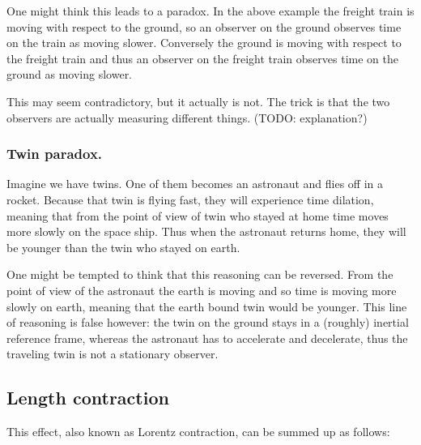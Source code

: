 One might think this leads to a paradox. In the above example the freight train is moving with respect to the ground, so an observer on the ground observes time on the train as moving slower. Conversely the ground is moving with respect to the freight train and thus an observer on the freight train observes time on the ground as moving slower.

This may seem contradictory, but it actually is not. The trick is that the two observers are actually measuring different things. (TODO: explanation?)

\subsubsection{Twin paradox.} Imagine we have twins. One of them becomes an astronaut and flies off in a rocket. Because that twin is flying fast, they will experience time dilation, meaning that from the point of view of twin who stayed at home time moves more slowly on the space ship. Thus when the astronaut returns home, they will be younger than the twin who stayed on earth.

One might be tempted to think that this reasoning can be reversed. From the point of view of the astronaut the earth is moving and so time is moving more slowly on earth, meaning that the earth bound twin would be younger. This line of reasoning is false however: the twin on the ground stays in a (roughly) inertial reference frame, whereas the astronaut has to accelerate and decelerate, thus the traveling twin is not a stationary observer.


\subsection{Length contraction}
This effect, also known as Lorentz contraction, can be summed up as follows:

